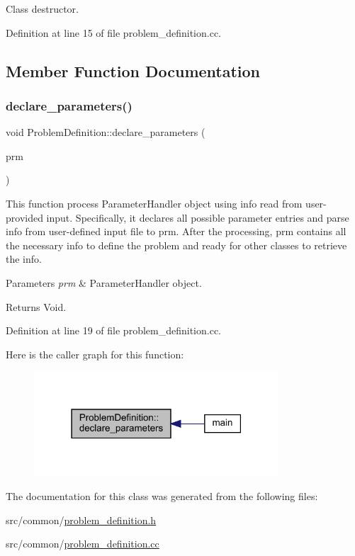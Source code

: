 Class destructor. 



Definition at line 15 of file problem\+\_\+definition.\+cc.



\subsection{Member Function Documentation}
\mbox{\label{class_problem_definition_a0a68b3c08b69729642dcfd37f23e7494}} 
\subsubsection{\texorpdfstring{declare\+\_\+parameters()}{declare\_parameters()}}
{\footnotesize\ttfamily void Problem\+Definition\+::declare\+\_\+parameters (\begin{DoxyParamCaption}\item[{Parameter\+Handler \&}]{prm }\end{DoxyParamCaption})\hspace{0.3cm}{\ttfamily [static]}}

This function process Parameter\+Handler object using info read from user-\/provided input. Specifically, it declares all possible parameter entries and parse info from user-\/defined input file to prm. After the processing, prm contains all the necessary info to define the problem and ready for other classes to retrieve the info.


\begin{DoxyParams}{Parameters}
{\em prm} & Parameter\+Handler object. \\
\hline
\end{DoxyParams}
\begin{DoxyReturn}{Returns}
Void. 
\end{DoxyReturn}


Definition at line 19 of file problem\+\_\+definition.\+cc.

Here is the caller graph for this function\+:\nopagebreak
\begin{figure}[H]
\begin{center}
\leavevmode
\includegraphics[width=259pt]{class_problem_definition_a0a68b3c08b69729642dcfd37f23e7494_icgraph}
\end{center}
\end{figure}


The documentation for this class was generated from the following files\+:\begin{DoxyCompactItemize}
\item 
src/common/\hyperlink{problem__definition_8h}{problem\+\_\+definition.\+h}\item 
src/common/\hyperlink{problem__definition_8cc}{problem\+\_\+definition.\+cc}\end{DoxyCompactItemize}

